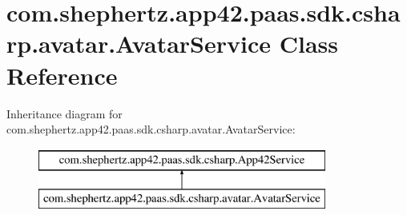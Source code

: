 \hypertarget{classcom_1_1shephertz_1_1app42_1_1paas_1_1sdk_1_1csharp_1_1avatar_1_1_avatar_service}{\section{com.\+shephertz.\+app42.\+paas.\+sdk.\+csharp.\+avatar.\+Avatar\+Service Class Reference}
\label{classcom_1_1shephertz_1_1app42_1_1paas_1_1sdk_1_1csharp_1_1avatar_1_1_avatar_service}
}
Inheritance diagram for com.\+shephertz.\+app42.\+paas.\+sdk.\+csharp.\+avatar.\+Avatar\+Service\+:\begin{figure}[H]
\begin{center}
\leavevmode
\includegraphics[height=2.000000cm]{classcom_1_1shephertz_1_1app42_1_1paas_1_1sdk_1_1csharp_1_1avatar_1_1_avatar_service}
\end{center}
\end{figure}
